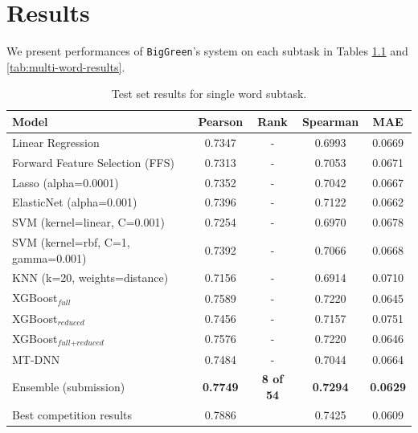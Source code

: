 \documentclass{dcthesis}
\theoremstyle{definition}
\theoremstyle{remark}
\begin{document}
\chapter{Results}

\vspace*{-\baselineskip}

We present performances of \texttt{BigGreen}'s system on each subtask in Tables \ref{tab:single-word-results} and \ref{tab:multi-word-results}.

\begin{table}[!htbp]
  \centering
  \begin{tabular}{l|cccc}
    \hline \textbf{Model} & \textbf{Pearson} & \textbf{Rank} & \textbf{Spearman} & \textbf{MAE} \\ \hline
    Linear Regression	& 0.7347 & - &	0.6993 &	0.0669 \\
    Forward Feature Selection (FFS)	& 0.7313 & - &	0.7053 & 0.0671 \\
    Lasso (alpha=0.0001) &	0.7352 & - &	0.7042 & 	0.0667 \\
    ElasticNet (alpha=0.001) &	0.7396 & - &	0.7122 &	0.0662 \\
    SVM (kernel=linear, C=0.001) &	0.7254 & - &	0.6970 &	0.0678 \\
    SVM (kernel=rbf, C=1, gamma=0.001) &	0.7392 & - &	0.7066 &	0.0668 \\
    KNN (k=20, weights=distance) &	0.7156 & -	& 0.6914 &	0.0710 \\
    \hline
    XGBoost$_\textit{full}$ &	0.7589 & - &	0.7220 &	0.0645 \\
    XGBoost$_\textit{reduced}$ &	0.7456 & - &	0.7157 &	0.0751 \\
    XGBoost$_{\textit{full}+\textit{reduced}}$ & 0.7576 & - & 0.7220 & 0.0646 \\
    MT-DNN & 0.7484 & -	& 0.7044 & 0.0664 \\
    Ensemble (submission) & \textbf{0.7749} & \textbf{8 of 54} & \textbf{0.7294} & \textbf{0.0629} \\
    \hline
    Best competition results & 0.7886 & & 0.7425 & 0.0609 \\ 
    \hline
  \end{tabular}
  \caption{\label{tab:single-word-results} Test set results for single word subtask. }
\end{table}
\end{document}
